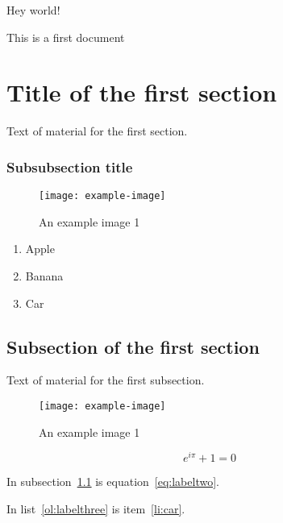 \documentclass{article}
\begin{document}
Hey world!

This is a first document

\section{Title of the first section}

Text of material for the first section.
\subsubsection{Subsubsection title}

\begin{figure}[hp]
	\centering
	\texttt{[image: example-image]}	\caption{An example image 1}
	\label{fig:exampleone}
\end{figure}

\begin{enumerate}
\label{ol:labelthree}
  \item Apple
  \item Banana
  \item Car
  \label{li:car}


\end{enumerate}


\subsection{Subsection of the first section}
\label{subsec:labelone}

Text of material for the first subsection.

\begin{figure}[hp]
	\centering
	\texttt{[image: example-image]}	\caption{An example image 1	\label{fig:exampletwo}}
	
\end{figure}


\begin{equation}
  e^{i\pi}+1 = 0
\label{eq:labeltwo}
\end{equation}

In subsection~\ref{subsec:labelone} is equation~\ref{eq:labeltwo}.





In list~\ref{ol:labelthree} is item~\ref{li:car}.
\end{document}
